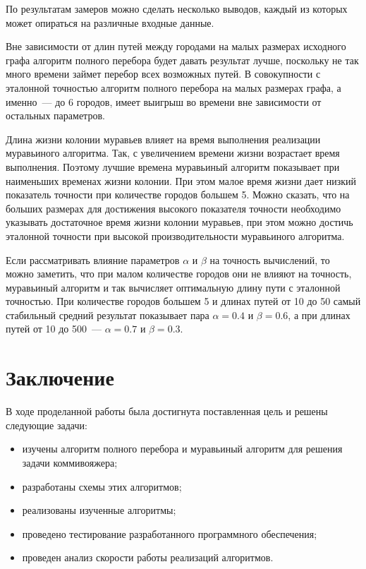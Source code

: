 \documentclass[12pt, a4paper]{report}
\begin{document}
	По результатам замеров можно сделать несколько выводов, каждый из которых может опираться на различные входные данные.
	
	Вне зависимости от длин путей между городами на малых размерах исходного графа алгоритм полного перебора будет давать результат лучше, поскольку не так много времени займет перебор всех возможных путей. В совокупности с эталонной точностью алгоритм полного перебора на малых размерах графа, а именно~--- до 6 городов, имеет выигрыш во времени вне зависимости от остальных параметров.
	
	Длина жизни колонии муравьев влияет на время выполнения реализации муравьиного алгоритма. Так, с увеличением времени жизни возрастает время выполнения. Поэтому лучшие времена муравьиный алгоритм показывает при наименьших временах жизни колонии. При этом малое время жизни дает низкий показатель точности при количестве городов большем 5. Можно сказать, что на больших размерах для достижения высокого показателя точности необходимо указывать достаточное время жизни колонии муравьев, при этом можно достичь эталонной точности при высокой производительности муравьиного алгоритма.
	
	Если рассматривать влияние параметров $\alpha$ и $\beta$ на точность вычислений, то можно заметить, что при малом количестве городов они не влияют на точность, муравьиный алгоритм и так вычисляет оптимальную длину пути с эталонной точностью. При количестве городов большем 5 и длинах путей от 10 до 50 самый стабильный средний результат показывает пара $\alpha = 0.4$ и $\beta = 0.6$, а при длинах путей от 10 до 500~--- $\alpha = 0.7$ и $\beta = 0.3$.
	
	
	\chapter*{Заключение}
	
	В ходе проделанной работы была достигнута поставленная цель и решены следующие задачи:
	
	\begin{itemize}
		\item изучены алгоритм полного перебора и муравьиный алгоритм для решения задачи коммивояжера;
		\item разработаны схемы этих алгоритмов;
		\item реализованы изученные алгоритмы;
		\item проведено тестирование разработанного программного обеспечения;
		\item проведен анализ скорости работы реализаций алгоритмов.
	\end{itemize}
	
\end{document}
